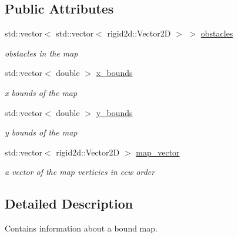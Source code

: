 \subsection*{Public Attributes}
\begin{DoxyCompactItemize}
\item 
\mbox{\label{structgrid_1_1Map_ab9f49bab16cb300a8de972a412c54375}} 
std\+::vector$<$ std\+::vector$<$ rigid2d\+::\+Vector2D $>$ $>$ \hyperlink{structgrid_1_1Map_ab9f49bab16cb300a8de972a412c54375}{obstacles}
\begin{DoxyCompactList}\small\item\em obstacles in the map \end{DoxyCompactList}\item 
\mbox{\label{structgrid_1_1Map_a44918e798d8fa1400ddf52bc52ce4c6f}} 
std\+::vector$<$ double $>$ \hyperlink{structgrid_1_1Map_a44918e798d8fa1400ddf52bc52ce4c6f}{x\+\_\+bounds}
\begin{DoxyCompactList}\small\item\em x bounds of the map \end{DoxyCompactList}\item 
\mbox{\label{structgrid_1_1Map_a5f51eeac70566244a15c1023e9f494fb}} 
std\+::vector$<$ double $>$ \hyperlink{structgrid_1_1Map_a5f51eeac70566244a15c1023e9f494fb}{y\+\_\+bounds}
\begin{DoxyCompactList}\small\item\em y bounds of the map \end{DoxyCompactList}\item 
\mbox{\label{structgrid_1_1Map_a5ee687d67cff44b8e447b2b92603056b}} 
std\+::vector$<$ rigid2d\+::\+Vector2D $>$ \hyperlink{structgrid_1_1Map_a5ee687d67cff44b8e447b2b92603056b}{map\+\_\+vector}
\begin{DoxyCompactList}\small\item\em a vector of the map verticies in ccw order \end{DoxyCompactList}\end{DoxyCompactItemize}


\subsection{Detailed Description}
Contains information about a bound map. 

